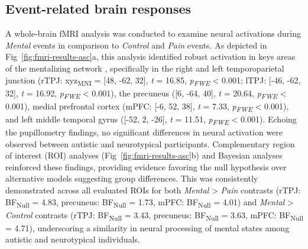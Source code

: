 \subsection{Event-related brain responses}
A whole-brain fMRI analysis was conducted to examine neural activations during \textit{Mental} events in comparison to \textit{Control} and \textit{Pain} events. As depicted in Fig~\ref{fig:fmri-results-asc}a, this analysis identified robust activation in keys areas of the mentalizing network \citep{schurz2014}, specifically in the right and left temporoparietal junction (rTPJ: xyz\textsubscript{MNI} = [48, -62, 32], \textit{t} = 16.85, \textit{p\textsubscript{FWE}} < 0.001; lTPJ: [-46, -62, 32], \textit{t} = 16.92, \textit{p\textsubscript{FWE}} < 0.001), the precuneus ([6, -64, 40], \textit{t} = 20.64, \textit{p\textsubscript{FWE}} < 0.001), medial prefrontal cortex (mPFC: [-6, 52, 38], \textit{t} = 7.33, \textit{p\textsubscript{FWE}} < 0.001), and left middle temporal gyrus ([-52, 2, -26], \textit{t} = 11.51, \textit{p\textsubscript{FWE}} < 0.001). Echoing the pupillometry findings, no significant differences in neural activation were observed between autistic and neurotypical participants. Complementary region of interest (ROI) analyses (Fig~\ref{fig:fmri-results-asc}b) and Bayesian analyses reinforced these findings, providing evidence favoring the null hypothesis over alternative models suggesting group differences. This was consistently demonstrated across all evaluated ROIs for both \textit{Mental} > \textit{Pain} contrasts (rTPJ: BF\textsubscript{Null} = 4.83, precuneus: BF\textsubscript{Null} = 1.73, mPFC: BF\textsubscript{Null} = 4.01) and \textit{Mental} > \textit{Control} contrasts (rTPJ: BF\textsubscript{Null} = 3.43, precuneus: BF\textsubscript{Null} = 3.63,  mPFC: BF\textsubscript{Null} = 4.71), underscoring a similarity in neural processing of mental states among autistic and neurotypical individuals.



